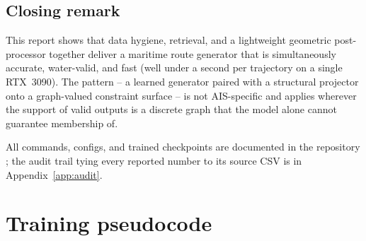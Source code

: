 \documentclass[oneside, a4paper, onecolumn, 11pt]{article}
\DeclareRobustCommand{\fpath}{\path}
\begin{document}
\subsection{Closing remark}

This report shows that data hygiene, retrieval, and a lightweight
geometric post-processor together deliver a maritime route generator
that is simultaneously accurate, water-valid, and fast (well under a
second per trajectory on a single RTX~3090).  The pattern -- a
learned generator paired with a structural projector onto a
graph-valued constraint surface -- is not AIS-specific and applies
wherever the support of valid outputs is a discrete graph that the
model alone cannot guarantee membership of.

All commands, configs, and trained checkpoints are documented in the
repository \fpath{README.md}; the audit trail tying every reported
number to its source CSV is in Appendix~\ref{app:audit}.

\appendix
\section{Training pseudocode}\label{app:train}
\end{document}
